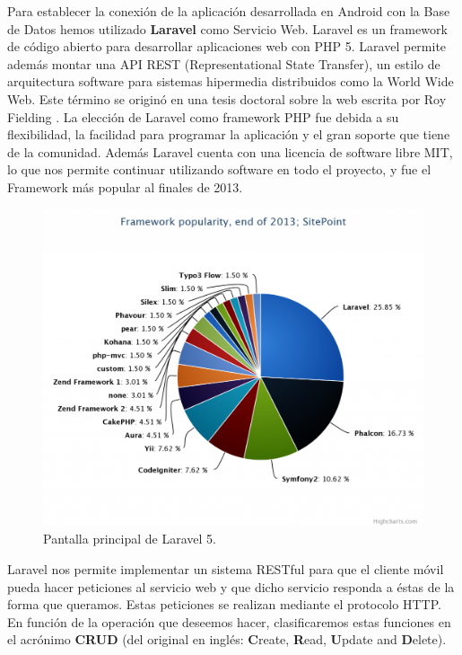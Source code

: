 Para establecer la conexión de la aplicación desarrollada en Android con la Base de Datos hemos utilizado \textbf{Laravel} como Servicio Web. Laravel \cite{ref:laravel} es un framework de código abierto para desarrollar aplicaciones web con PHP 5. Laravel permite además montar una API REST (Representational State Transfer), un estilo de arquitectura software para sistemas hipermedia distribuidos como la World Wide Web. Este término se originó en una tesis doctoral sobre la web escrita por Roy Fielding \cite{ref:RESTPhd}. La elección de Laravel como framework PHP fue debida a su flexibilidad, la facilidad para programar la aplicación y el gran soporte que tiene de la comunidad. Además Laravel cuenta con una licencia de software libre MIT, lo que nos permite continuar utilizando software en todo el proyecto, y fue el Framework más popular al finales de 2013.

\begin{figure}[H]
\centering
\includegraphics[keepaspectratio, scale=0.30]{Media/Captures/frameworkPopularity.png}
\caption{Pantalla principal de Laravel 5.}
\label{fig:laravel5}
\end{figure}

Laravel nos permite implementar un sistema RESTful para que el cliente móvil pueda hacer peticiones al servicio web y que dicho servicio responda a éstas de la forma que queramos. Estas peticiones se realizan mediante el protocolo HTTP. En función de la operación que deseemos hacer, clasificaremos estas funciones en el acrónimo \textbf{CRUD} \cite{ref:CRUD} (del original en inglés: \textbf{C}reate, \textbf{R}ead, \textbf{U}pdate and \textbf{D}elete).

